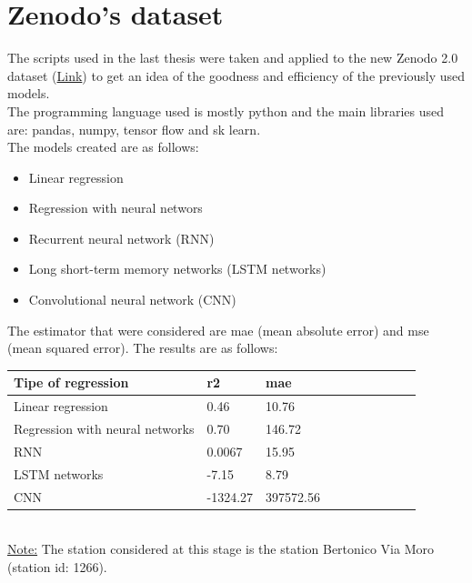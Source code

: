
\section{Zenodo's dataset}
The scripts used in the last thesis were taken and applied to the new Zenodo 2.0 dataset (\href{https://zenodo.org/record/7563265#.ZAm2_y0QP5g}{Link}) to get an idea of the goodness and efficiency of the previously used models.
\\The programming language used is mostly python and the main libraries used are: pandas, numpy, tensor flow and sk learn.
\\The models created are as follows:
\begin{itemize}
    \item Linear regression
    \item Regression with neural networs
    \item Recurrent neural network (RNN)
    \item Long short-term memory networks (LSTM networks)
    \item Convolutional neural network (CNN)
\end{itemize}
The estimator that were considered are mae (mean absolute error) and mse (mean squared error). The results are as follows:
\begin{table}[!ht]
    \centering
    \begin{tabular}{|l|l|l|l|l|l|l|l|l|l|}
    \hline
        Tipe of regression & r2 & mae \\ \hline
        Linear regression & 0.46 & 10.76 \\ \hline
        Regression with neural networks & 0.70 & 146.72 \\ \hline
        RNN & 0.0067 & 15.95 \\ \hline
        LSTM networks & -7.15 & 8.79 \\ \hline
        CNN & -1324.27 & 397572.56 \\ \hline
  
    \end{tabular}
\end{table}
\\\underline{Note:} The station considered at this stage is the station Bertonico Via Moro (station id: 1266).

